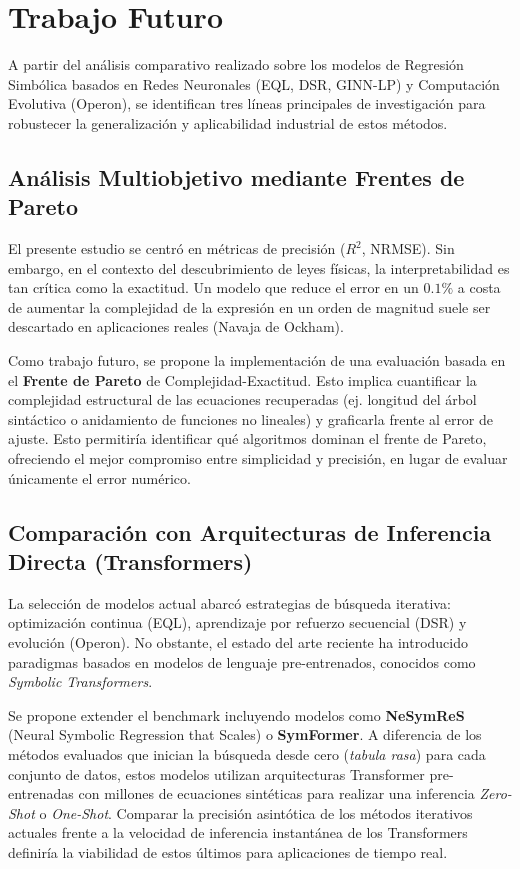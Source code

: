 \newpage
\section{Trabajo Futuro}

A partir del análisis comparativo realizado sobre los modelos de Regresión Simbólica basados en Redes Neuronales (EQL, DSR, GINN-LP) y Computación Evolutiva (Operon), se identifican tres líneas principales de investigación para robustecer la generalización y aplicabilidad industrial de estos métodos.

\subsection{Análisis Multiobjetivo mediante Frentes de Pareto}
El presente estudio se centró en métricas de precisión ($R^2$, NRMSE). Sin embargo, en el contexto del descubrimiento de leyes físicas, la interpretabilidad es tan crítica como la exactitud. Un modelo que reduce el error en un $0.1\%$ a costa de aumentar la complejidad de la expresión en un orden de magnitud suele ser descartado en aplicaciones reales (Navaja de Ockham).

Como trabajo futuro, se propone la implementación de una evaluación basada en el \textbf{Frente de Pareto} de Complejidad-Exactitud. Esto implica cuantificar la complejidad estructural de las ecuaciones recuperadas (ej. longitud del árbol sintáctico o anidamiento de funciones no lineales) y graficarla frente al error de ajuste. Esto permitiría identificar qué algoritmos dominan el frente de Pareto, ofreciendo el mejor compromiso entre simplicidad y precisión, en lugar de evaluar únicamente el error numérico.

\subsection{Comparación con Arquitecturas de Inferencia Directa (Transformers)}
La selección de modelos actual abarcó estrategias de búsqueda iterativa: optimización continua (EQL), aprendizaje por refuerzo secuencial (DSR) y evolución (Operon). No obstante, el estado del arte reciente ha introducido paradigmas basados en modelos de lenguaje pre-entrenados, conocidos como \textit{Symbolic Transformers}.

Se propone extender el benchmark incluyendo modelos como \textbf{NeSymReS} (Neural Symbolic Regression that Scales) \cite{biglari2021} o \textbf{SymFormer}. A diferencia de los métodos evaluados que inician la búsqueda desde cero (\textit{tabula rasa}) para cada conjunto de datos, estos modelos utilizan arquitecturas Transformer pre-entrenadas con millones de ecuaciones sintéticas para realizar una inferencia \textit{Zero-Shot} o \textit{One-Shot}. Comparar la precisión asintótica de los métodos iterativos actuales frente a la velocidad de inferencia instantánea de los Transformers definiría la viabilidad de estos últimos para aplicaciones de tiempo real.


